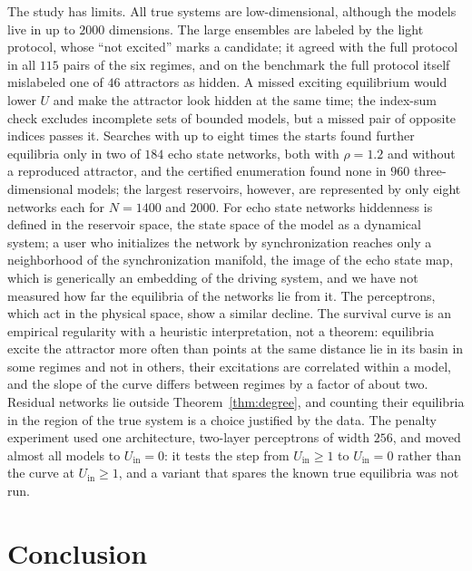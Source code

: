 \documentclass[aip,cha,reprint,amsmath,amssymb,longbibliography]{revtex4-2}
\theoremstyle{definition}
\newcommand{\Uin}{U_{\mathrm{in}}}
\begin{document}
The study has limits. All true systems are low-dimensional, although the models live in up to $2000$ dimensions. The large
ensembles are labeled by the light protocol, whose ``not excited'' marks a candidate; it agreed with the full protocol in all $115$
pairs of the six regimes, and on the benchmark the full protocol itself mislabeled one of $46$ attractors as hidden. A missed exciting
equilibrium would lower $U$ and make the attractor look hidden at the same time; the index-sum check excludes incomplete sets
of bounded models, but a missed pair of opposite indices passes it. Searches with up to eight times the starts found
further equilibria only in two of $184$ echo state networks, both with $\rho=1.2$ and without a reproduced attractor, and
the certified enumeration found none in $960$ three-dimensional models; the largest reservoirs, however, are represented by only eight networks each for $N=1400$
and $2000$. For echo state networks hiddenness is defined in the
reservoir space, the state space of the model as a dynamical system; a user who initializes the network by synchronization
reaches only a neighborhood of the synchronization manifold, the image of the echo state map, which is generically an
embedding of the driving system,\cite{HartHookDawes2020} and we have not measured how far the equilibria of the networks
lie from it. The perceptrons, which act in the physical space, show a similar decline. The survival curve is
an empirical regularity with a heuristic interpretation, not a theorem: equilibria excite the attractor more often than
points at the same distance lie in its basin in some regimes and not in others, their excitations are correlated within a
model, and the slope of the curve differs between regimes by a factor of about two. Residual networks lie outside
Theorem~\ref{thm:degree}, and counting their equilibria in the region of the true system is a choice justified by the data.
The penalty experiment used one architecture, two-layer perceptrons of width $256$, and moved almost all models to
$\Uin=0$: it tests the step from $\Uin\ge1$ to $\Uin=0$ rather than the curve at $\Uin\ge1$, and a variant that spares the
known true equilibria was not run.

\section{Conclusion}
\label{sec:conclusion}
\end{document}
